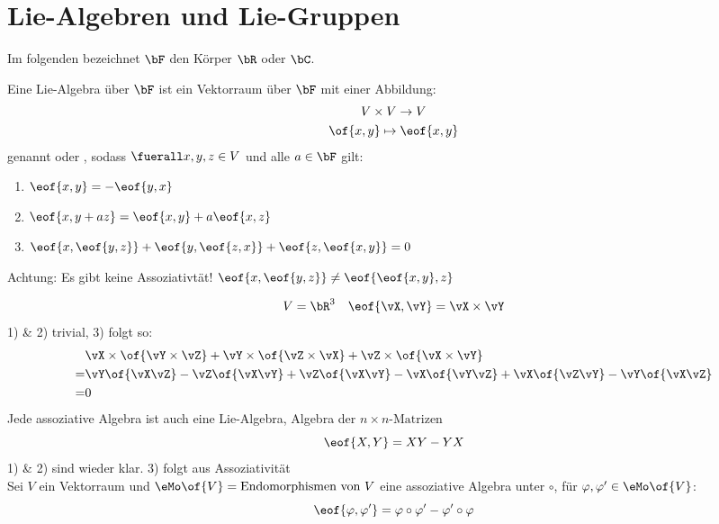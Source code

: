 \section{Lie-Algebren und Lie-Gruppen}
Im folgenden bezeichnet $\bF$ den Körper $\bR$ oder $\bC$.
\begin{definition}
	Eine Lie-Algebra über $\bF$ ist ein Vektorraum über $\bF$ mit einer Abbildung:
	\begin{gather}
		V\times V \to V \\
		\of{x,y} \mapsto \eof{x,y}
	\end{gather}
	genannt  oder , sodass $\fuerall x,y,z \in V$ und alle $a \in \bF$ gilt:
	\begin{enumerate}
		\item $\eof{x,y} = - \eof{y,x}$ 
		\item $\eof{x,y+az} = \eof{x,y} + a \eof{x,z}$ 
		\item $\eof{x,\eof{y,z}} + \eof{y,\eof{z,x}} + \eof{z,\eof{x,y}} = 0$ 
	\end{enumerate}
	Achtung: Es gibt keine Assoziativtät! $\eof{x,\eof{y,z}} \neq \eof{\eof{x,y},z}$
\end{definition}
\begin{beispiel}
	\begin{equation}
		V = \bR^3 \quad \eof{\vX,\vY} = \vX \times \vY
	\end{equation}
	1) \& 2) trivial, 3) folgt so:
	\begin{equation}
		\begin{split}
			& \vX \times \of{\vY\times\vZ} + \vY \times\of{\vZ\times\vX} + \vZ \times\of{\vX\times\vY} \\
			= & \vY\of{\vX\vZ} - \vZ\of{\vX\vY} + \vZ\of{\vX\vY} - \vX\of{\vY\vZ} + \vX\of{\vZ\vY} - \vY\of{\vX\vZ} \\
			= & 0
		\end{split}
	\end{equation}
	Jede assoziative Algebra ist auch eine Lie-Algebra, \exmpl Algebra der $n\times n\text{-Matrizen}$
	\begin{equation}
		\eof{X,Y} = XY - YX
	\end{equation}
	1) \& 2) sind wieder klar. 3) folgt aus Assoziativität \\
	Sei $V$ ein Vektorraum und $\eMo\of{V} = \text{Endomorphismen von $V$}$ eine assoziative Algebra unter $\circ$, \dah für $\varphi,\varphi' \in \eMo\of{V}$:
	\begin{equation}
		\eof{\varphi,\varphi'} = \varphi\circ\varphi' - \varphi'\circ\varphi
	\end{equation}
\end{beispiel}
